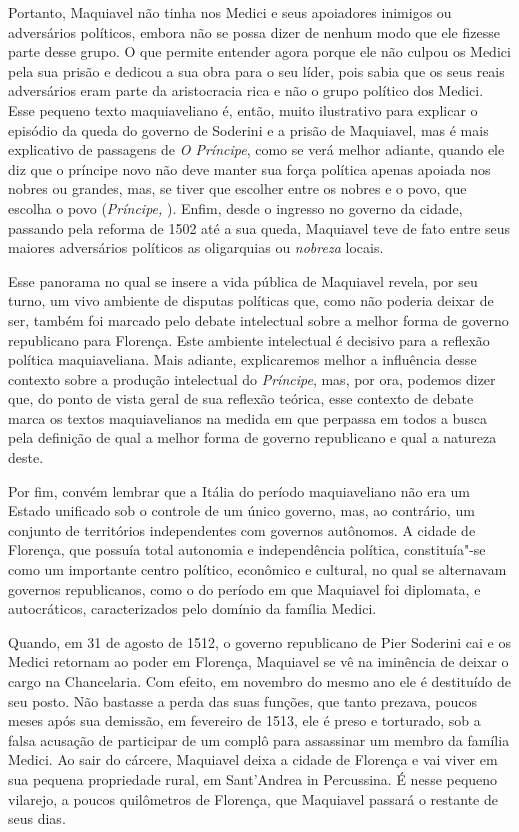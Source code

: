 Portanto, Maquiavel não tinha nos Medici e seus apoiadores inimigos ou
adversários políticos, embora não se possa dizer de nenhum modo que ele
fizesse parte desse grupo. O que permite entender agora porque ele não
culpou os Medici pela sua prisão e dedicou a sua obra para o seu líder,
pois sabia que os seus reais adversários eram parte da aristocracia rica
e não o grupo político dos Medici. Esse pequeno texto maquiaveliano é,
então, muito ilustrativo para explicar o episódio da queda do governo de
Soderini e a prisão de Maquiavel, mas é mais explicativo de passagens de
\emph{O Príncipe}, como se verá melhor adiante, quando ele diz que o
príncipe novo não deve manter sua força política apenas apoiada nos
nobres ou grandes, mas, se tiver que escolher entre os nobres e o povo,
que escolha o povo (\emph{Príncipe,} ). Enfim, desde o ingresso no
governo da cidade, passando pela reforma de 1502 até a sua queda,
Maquiavel teve de fato entre seus maiores adversários políticos as
oligarquias ou \emph{nobreza} locais.

Esse panorama no qual se insere a vida pública de Maquiavel revela, por
seu turno, um vivo ambiente de disputas políticas que, como não poderia
deixar de ser, também foi marcado pelo debate intelectual sobre a melhor
forma de governo republicano para Florença. Este ambiente intelectual é
decisivo para a reflexão política maquiaveliana. Mais adiante,
explicaremos melhor a influência desse contexto sobre a produção
intelectual do \emph{Príncipe}, mas, por ora, podemos dizer que, do
ponto de vista geral de sua reflexão teórica, esse contexto de debate
marca os textos maquiavelianos na medida em que perpassa em todos a
busca pela definição de qual a melhor forma de governo republicano e
qual a natureza deste.

Por fim, convém lembrar que a Itália do período maquiaveliano não era um
Estado unificado sob o controle de um único governo, mas, ao contrário,
um conjunto de territórios independentes com governos autônomos. A
cidade de Florença, que possuía total autonomia e independência
política, constituía"-se como um importante centro político, econômico e
cultural, no qual se alternavam governos republicanos, como o do período
em que Maquiavel foi diplomata, e autocráticos, caracterizados pelo
domínio da família Medici.

Quando, em 31 de agosto de 1512, o governo republicano de Pier Soderini
cai e os Medici retornam ao poder em Florença, Maquiavel se vê na
iminência de deixar o cargo na Chancelaria. Com efeito, em novembro do
mesmo ano ele é destituído de seu posto. Não bastasse a perda das suas
funções, que tanto prezava, poucos meses após sua demissão, em fevereiro
de 1513, ele é preso e torturado, sob a falsa acusação de participar de
um complô para assassinar um membro da família Medici. Ao sair do
cárcere, Maquiavel deixa a cidade de Florença e vai viver em sua pequena
propriedade rural, em Sant'Andrea in Percussina. É nesse pequeno
vilarejo, a poucos quilômetros de Florença, que Maquiavel passará o
restante de seus dias.

